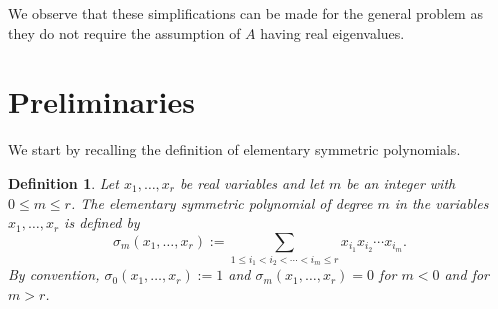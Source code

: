 \documentclass[12pt]{article}
\newtheorem{definition}{Definition}[section]
\begin{document}
We observe that these simplifications can be made for the general problem as they do not require the assumption of $A$ having real eigenvalues.

\section{Preliminaries}

We start by recalling the definition of elementary symmetric polynomials.
\begin{definition}
Let $x_1,\dots,x_r$ be real variables and let $m$ be an integer with
$0\le m\le r$.
The \emph{elementary symmetric polynomial of degree $m$}
in the variables $x_1,\dots,x_r$ is defined by
\[
\sigma_m(x_1,\dots,x_r)
:=
\sum_{1\le i_1<i_2<\cdots<i_m\le r}
x_{i_1}x_{i_2}\cdots x_{i_m}.
\]
By convention, $\sigma_0(x_1,\dots,x_r):=1$ and $\sigma_m(x_1,\dots,x_r)=0$ for $m<0$ and for $m>r$.
\end{definition}
\end{document}
